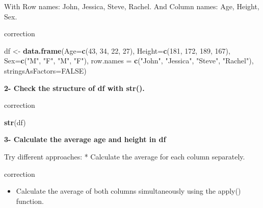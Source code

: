 \documentclass[]{book}
\newenvironment{Shaded}{\begin{snugshade}}{\end{snugshade}}
\newcommand{\DataTypeTok}[1]{\textcolor[rgb]{0.13,0.29,0.53}{#1}}
\newcommand{\DecValTok}[1]{\textcolor[rgb]{0.00,0.00,0.81}{#1}}
\newcommand{\KeywordTok}[1]{\textcolor[rgb]{0.13,0.29,0.53}{\textbf{#1}}}
\newcommand{\NormalTok}[1]{#1}
\newcommand{\OperatorTok}[1]{\textcolor[rgb]{0.81,0.36,0.00}{\textbf{#1}}}
\newcommand{\OtherTok}[1]{\textcolor[rgb]{0.56,0.35,0.01}{#1}}
\newcommand{\StringTok}[1]{\textcolor[rgb]{0.31,0.60,0.02}{#1}}
\providecommand{\tightlist}{%
  \setlength{\itemsep}{0pt}\setlength{\parskip}{0pt}}
\begin{document}
With Row names: John, Jessica, Steve, Rachel.
And Column names: Age, Height, Sex.

correction

\begin{Shaded}
\begin{Highlighting}[]
\NormalTok{df <-}\StringTok{ }\KeywordTok{data.frame}\NormalTok{(}\DataTypeTok{Age=}\KeywordTok{c}\NormalTok{(}\DecValTok{43}\NormalTok{, }\DecValTok{34}\NormalTok{, }\DecValTok{22}\NormalTok{, }\DecValTok{27}\NormalTok{), }
                 \DataTypeTok{Height=}\KeywordTok{c}\NormalTok{(}\DecValTok{181}\NormalTok{, }\DecValTok{172}\NormalTok{, }\DecValTok{189}\NormalTok{, }\DecValTok{167}\NormalTok{),}
                 \DataTypeTok{Sex=}\KeywordTok{c}\NormalTok{(}\StringTok{"M"}\NormalTok{, }\StringTok{"F"}\NormalTok{, }\StringTok{"M"}\NormalTok{, }\StringTok{"F"}\NormalTok{),}
                 \DataTypeTok{row.names =} \KeywordTok{c}\NormalTok{(}\StringTok{"John"}\NormalTok{, }\StringTok{"Jessica"}\NormalTok{, }\StringTok{"Steve"}\NormalTok{, }\StringTok{"Rachel"}\NormalTok{),}
                 \DataTypeTok{stringsAsFactors=}\OtherTok{FALSE}\NormalTok{)}
\end{Highlighting}
\end{Shaded}

\textbf{2- Check the structure of df with str().}

correction

\begin{Shaded}
\begin{Highlighting}[]
\KeywordTok{str}\NormalTok{(df)}
\end{Highlighting}
\end{Shaded}

\textbf{3- Calculate the average age and height in df}

Try different approaches:
* Calculate the average for each column separately.

correction

\begin{Shaded}
\end{Shaded}

\begin{itemize}
\tightlist
\item
  Calculate the average of both columns simultaneously using the apply() function.
\end{itemize}
\end{document}

